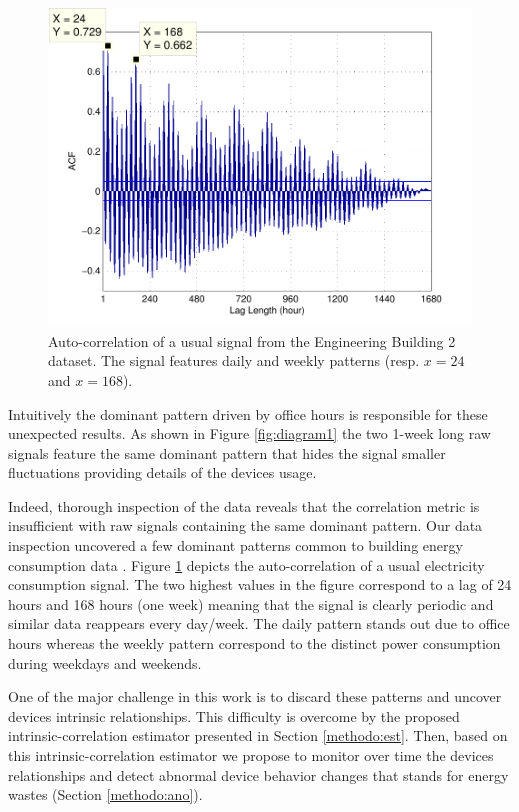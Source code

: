 \begin{figure}[t!]
\begin{center}
\includegraphics[width=.45\textwidth]{img/acf_101A1_GHP-eps-converted-to.pdf}
\caption{Auto-correlation of a usual signal from the Engineering Building 2 dataset.
The signal features daily and weekly patterns (resp. $x=24$ and $x=168$).}
\label{fig:autocorr}
\end{center}
\end{figure}

Intuitively the dominant pattern driven by office hours is responsible for these unexpected results.
As shown in Figure \ref{fig:diagram1} the two 1-week long raw signals feature the same dominant pattern that hides the signal smaller fluctuations providing details of the devices usage.

Indeed, thorough inspection of the data reveals that the correlation metric is insufficient with raw signals containing the same dominant pattern.
Our data inspection uncovered a few dominant patterns common to building energy consumption data \cite{wrinch:pes2012}.
Figure \ref{fig:autocorr} depicts the auto-correlation of a usual electricity consumption signal.
The two highest values in the figure correspond to a lag of 24 hours and 168 hours (one week) meaning that the signal is clearly periodic and similar data reappears every day/week.
The daily pattern stands out due to office hours whereas the weekly pattern correspond to the distinct power consumption during weekdays and weekends.

One of the major challenge in this work is to discard these patterns and uncover devices intrinsic relationships.
This difficulty is overcome by the proposed intrinsic-correlation estimator presented in Section \ref{methodo:est}.
Then, based on this intrinsic-correlation estimator we propose to monitor over time the devices relationships and detect abnormal device behavior changes that stands for energy wastes (Section \ref{methodo:ano}).
